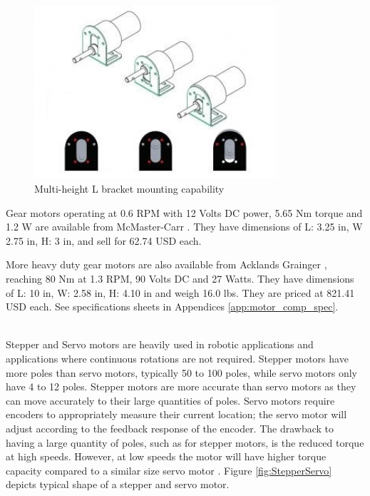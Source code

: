 \begin{figure}[H]
    \centering
    \includegraphics[width=0.8\textwidth]{Sections/LiteratureReview/img/LegAssembly/gearFootMotorMounting.jpg}
    \caption{Multi-height L bracket mounting capability \cite{robu_easymech_nodate}}
    \label{fig:foot_mounting assembly}
\end{figure}


Gear motors operating at 0.6 RPM with 12 Volts DC power,  5.65 Nm torque and 1.2 W are available from McMaster-Carr \cite{mcmaster-carr_gearmotors_nodate}. They have dimensions of L: 3.25 in, W 2.75 in, H: 3 in, and sell for 62.74 USD each.

More heavy duty gear motors are also available from Acklands Grainger \cite{acklands_grainger_dc_nodate}, reaching 80 Nm at 1.3 RPM, 90 Volts DC and 27 Watts. They have dimensions of L: 10 in, W: 2.58 in, H: 4.10 in and weigh 16.0 lbs. They are priced at 821.41 USD each. 
See specifications sheets in Appendices \ref{app:motor_comp_spec}.

 \mbox{}\\
Stepper and Servo motors are heavily used in robotic applications and applications where continuous rotations are not required. Stepper motors have more poles than servo motors, typically 50 to 100 poles, while servo motors only have 4 to 12 poles. Stepper motors are more accurate than servo motors as they can move accurately to their large quantities of poles. Servo motors require encoders to appropriately measure their current location; the servo motor will adjust according to the feedback response of the encoder.  The drawback to having a large quantity of poles, such as for stepper motors, is the reduced torque at high speeds. However, at low speeds the motor will have higher torque capacity compared to a similar size servo motor \cite{amci_stepper_nodate}. Figure \ref{fig:StepperServo} depicts typical shape of a stepper and servo motor.


